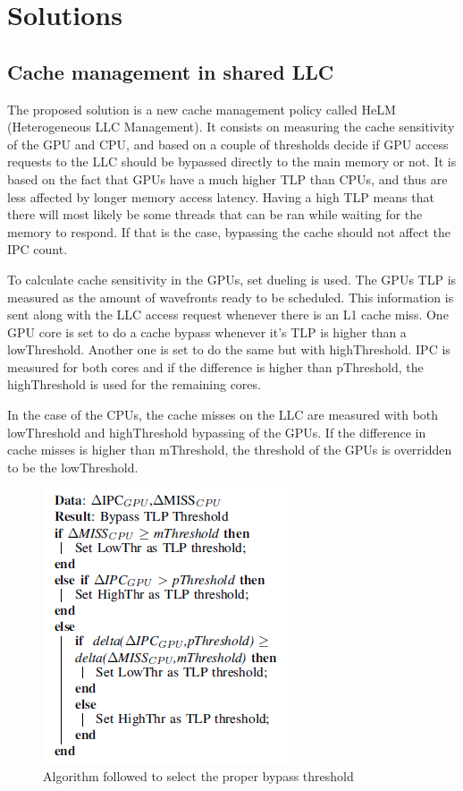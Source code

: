 \documentclass[journal]{IEEEtran}
\begin{document}
\section{Solutions}
\subsection{Cache management in shared LLC}
The proposed solution is a new cache management policy called HeLM (Heterogeneous LLC Management). It consists on measuring the cache sensitivity of the GPU and CPU, and based on a couple of thresholds decide if GPU access requests to the LLC should be bypassed directly to the main memory or not.
It is based on the fact that GPUs have a much higher TLP than CPUs, and thus are less affected by longer memory access latency. Having a high TLP means that there will most likely be some threads that can be ran while waiting for the memory to respond. If that is the case, bypassing the cache should not affect the IPC count.

To calculate cache sensitivity in the GPUs, set dueling is used. The GPUs TLP is measured as the amount of wavefronts ready to be scheduled. This information is sent along with the LLC access request whenever there is an L1 cache miss. One GPU core is set to do a cache bypass whenever it's TLP is higher than a lowThreshold. Another one is set to do the same but with highThreshold. IPC is measured for both cores and if the difference is higher than pThreshold, the highThreshold is used for the remaining cores.

In the case of the CPUs, the cache misses on the LLC are measured with both lowThreshold and highThreshold bypassing of the GPUs. If the difference in cache misses is higher than mThreshold, the threshold of the GPUs is overridden to be the lowThreshold.

\begin{figure}[H]
	\centering
	\includegraphics[width = 6 cm]{graphics/LLCalgo.png}
	\caption{Algorithm followed to select the proper bypass threshold\cite{LLC}}\label{fig:algo}
\end{figure} 
\end{document}
